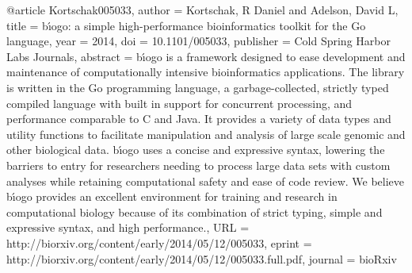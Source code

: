 @article {Kortschak005033,
	author = {Kortschak, R Daniel and Adelson, David L},
	title = {b{\'\i}ogo: a simple high-performance bioinformatics toolkit for the Go language},
	year = {2014},
	doi = {10.1101/005033},
	publisher = {Cold Spring Harbor Labs Journals},
	abstract = {b{\'\i}ogo is a framework designed to ease development and maintenance of computationally intensive bioinformatics applications. The library is written in the Go programming language, a garbage-collected, strictly typed compiled language with built in support for concurrent processing, and performance comparable to C and Java. It provides a variety of data types and utility functions to facilitate manipulation and analysis of large scale genomic and other biological data. b{\'\i}ogo uses a concise and expressive syntax, lowering the barriers to entry for researchers needing to process large data sets with custom analyses while retaining computational safety and ease of code review. We believe b{\'\i}ogo provides an excellent environment for training and research in computational biology because of its combination of strict typing, simple and expressive syntax, and high performance.},
	URL = {http://biorxiv.org/content/early/2014/05/12/005033},
	eprint = {http://biorxiv.org/content/early/2014/05/12/005033.full.pdf},
	journal = {bioRxiv}
}

